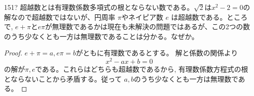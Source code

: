 \begin{thm}{151}{\hosi ?}{}
 超越数とは有理数係数多項式の根とならない数である。$\sqrt{2}$は$x^2-2=0$の解なので超越数ではないが、円周率 $\pi$やネイピア数 $e$ は超越数である。ところで, $e+\pi$と$e\pi$が無理数であるかは現在も未解決の問題ではあるが、この2つの数のうち少なくとも一方は無理数であることは分かる。なぜか。
\end{thm}

\begin{proof}
$e+\pi=a, e\pi =b$がともに有理数であるとする。 解と係数の関係より
\[x^2-ax+b=0\]
の解が$\pi ,e$である。これらはどちらも超越数であるから, 有理数係数方程式の根とならないことから矛盾する。従って $a,b$のうち少なくとも一方は無理数である。
\end{proof}
